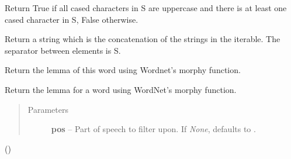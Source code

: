 \documentclass[letterpaper,10pt,english]{sphinxmanual}
\begin{document}
\begin{fulllineitems}
\begin{fulllineitems}
\end{fulllineitems}


\begin{fulllineitems}
\label{api_reference:textblob_de.blob.Word.isupper}
Return True if all cased characters in S are uppercase and there is
at least one cased character in S, False otherwise.

\end{fulllineitems}


\begin{fulllineitems}
\label{api_reference:textblob_de.blob.Word.join}
Return a string which is the concatenation of the strings in the
iterable.  The separator between elements is S.

\end{fulllineitems}


\begin{fulllineitems}
\label{api_reference:textblob_de.blob.Word.lemma}
Return the lemma of this word using Wordnet's morphy function.

\end{fulllineitems}


\begin{fulllineitems}
\label{api_reference:textblob_de.blob.Word.lemmatize}
Return the lemma for a word using WordNet's morphy function.
\begin{quote}\begin{description}
\item[{Parameters}] \leavevmode
\textbf{pos} -- Part of speech to filter upon. If \emph{None}, defaults to
.

\end{description}\end{quote}

()

\end{fulllineitems}


\end{fulllineitems}
\end{document}
